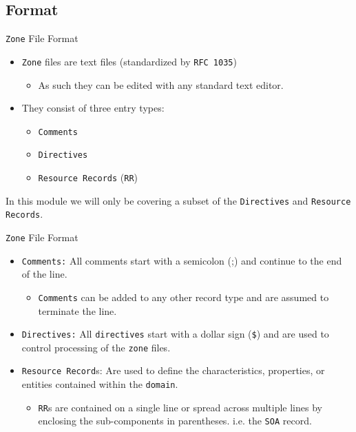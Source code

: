 \documentclass[xcolor=table]{beamer}
\begin{document}
\subsection{Format}
\begin{frame}{\texttt{Zone} File Format}
  \begin{itemize}
    \item \texttt{Zone} files are text files (standardized by \texttt{RFC 1035})
      \begin{itemize}
        \item As such they can be edited with any standard text editor.
      \end{itemize}
    \item They consist of three entry types:
      \begin{itemize}
        \item \texttt{Comments}
        \item \texttt{Directives}
        \item \texttt{Resource Records} (\texttt{RR})
      \end{itemize}
  \end{itemize}
  \begin{tcolorbox}[title={\textbf{NOTE:}}]
    In this module we will only be covering a subset of the \texttt{Directives} and \texttt{Resource Records}.
  \end{tcolorbox}  
\end{frame}

\begin{frame}{\texttt{Zone} File Format}
  \begin{itemize}
    \item \texttt{Comments:} All comments start with a semicolon (;) and continue to the end of the line. 
      \begin{itemize}
        \item \texttt{Comments} can be added to any other record type and are assumed to terminate the line.
      \end{itemize}
    \item \texttt{Directives:} All \texttt{directives} start with a dollar sign (\texttt{\$}) and are used to control processing of the \texttt{zone} files.
    \item \texttt{Resource Record}s: Are used to define the characteristics, properties, or entities contained within the \texttt{domain}. 
    \begin{itemize}
        \item \texttt{RR}s are contained on a single line or spread across multiple lines by enclosing the sub-components in parentheses. i.e. the \texttt{SOA} record.
      \end{itemize}
  \end{itemize}
\end{frame}
\end{document}

